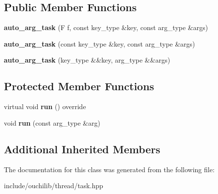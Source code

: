 \subsection*{Public Member Functions}
\begin{DoxyCompactItemize}
\item 
\mbox{\label{classouchi_1_1task_1_1auto__arg__task_ad74624c5d6f63d7186f34c3740601cad}} 
{\bfseries auto\+\_\+arg\+\_\+task} (F f, const key\+\_\+type \&key, const arg\+\_\+type \&args)
\item 
\mbox{\label{classouchi_1_1task_1_1auto__arg__task_aa5bd32def3b6838d58eeb07a14f95259}} 
{\bfseries auto\+\_\+arg\+\_\+task} (const key\+\_\+type \&key, const arg\+\_\+type \&args)
\item 
\mbox{\label{classouchi_1_1task_1_1auto__arg__task_a06b2ac5bca2f1cf1f4cbd6cc4900de72}} 
{\bfseries auto\+\_\+arg\+\_\+task} (key\+\_\+type \&\&key, arg\+\_\+type \&\&args)
\end{DoxyCompactItemize}
\subsection*{Protected Member Functions}
\begin{DoxyCompactItemize}
\item 
\mbox{\label{classouchi_1_1task_1_1auto__arg__task_ad75398e5b6925ce167dc54f677ebf12e}} 
virtual void {\bfseries run} () override
\item 
\mbox{\label{classouchi_1_1task_1_1auto__arg__task_a8b3acd3a7181613bbaeaa815283839eb}} 
void {\bfseries run} (const arg\+\_\+type \&arg)
\end{DoxyCompactItemize}
\subsection*{Additional Inherited Members}


The documentation for this class was generated from the following file\+:\begin{DoxyCompactItemize}
\item 
include/ouchilib/thread/task.\+hpp\end{DoxyCompactItemize}

